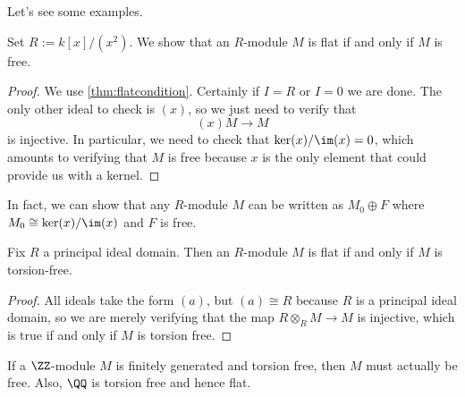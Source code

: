 \noindent Let's see some examples.
\begin{exe}
	Set $R:=k[x]/\left(x^2\right)$. We show that an $R$-module $M$ is flat if and only if $M$ is free.
\end{exe}
\begin{proof}
	We use \autoref{thm:flatcondition}. Certainly if $I=R$ or $I=0$ we are done. The only other ideal to check is $(x)$, so we just need to verify that
	\[(x)M\to M\]
	is injective. In particular, we need to check that $\ker(x)/\im(x)=0$, which amounts to verifying that $M$ is free because $x$ is the only element that could provide us with a kernel.
\end{proof}
\begin{remark}[Serganova]
	In fact, we can show that any $R$-module $M$ can be written as $M_0\oplus F$ where $M_0\cong\ker(x)/\im(x)$ and $F$ is free.
\end{remark}
\begin{exe}
	Fix $R$ a principal ideal domain. Then an $R$-module $M$ is flat if and only if $M$ is torsion-free.
\end{exe}
\begin{proof}
	All ideals take the form $(a)$, but $(a)\cong R$ because $R$ is a principal ideal domain, so we are merely verifying that the map $R\otimes_RM\to M$ is injective, which is true if and only if $M$ is torsion free.
\end{proof}
\begin{example}
	If a $\ZZ$-module $M$ is finitely generated and torsion free, then $M$ must actually be free. Also, $\QQ$ is torsion free and hence flat.
\end{example}

